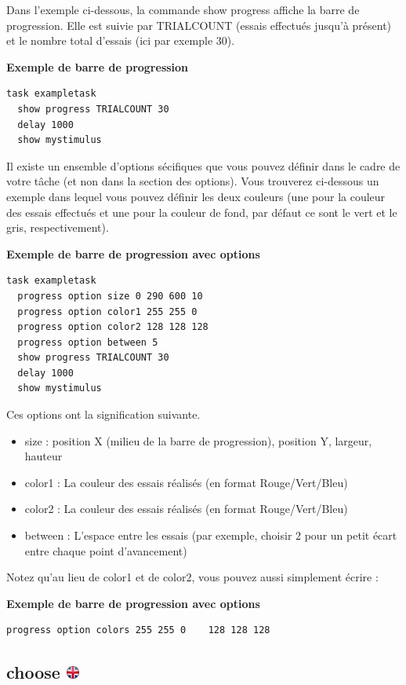 \documentclass[
]{book}
\providecommand{\tightlist}{%
  \setlength{\itemsep}{0pt}\setlength{\parskip}{0pt}}
\begin{document}
Dans l'exemple ci-dessous, la commande show progress affiche la barre de progression. Elle est suivie par TRIALCOUNT (essais effectués jusqu'à présent) et le nombre total d'essais (ici par exemple 30).

\textbf{Exemple de barre de progression}

\begin{verbatim}
task exampletask
  show progress TRIALCOUNT 30
  delay 1000
  show mystimulus
\end{verbatim}

Il existe un ensemble d'options sécifiques que vous pouvez définir dans le cadre de votre tâche (et non dans la section des options). Vous trouverez ci-dessous un exemple dans lequel vous pouvez définir les deux couleurs (une pour la couleur des essais effectués et une pour la couleur de fond, par défaut ce sont le vert et le gris, respectivement).

\textbf{Exemple de barre de progression avec options}

\begin{verbatim}
task exampletask
  progress option size 0 290 600 10
  progress option color1 255 255 0
  progress option color2 128 128 128
  progress option between 5
  show progress TRIALCOUNT 30
  delay 1000
  show mystimulus
\end{verbatim}

Ces options ont la signification suivante.

\begin{itemize}
\tightlist
\item
  size : position X (milieu de la barre de progression), position Y, largeur, hauteur
\item
  color1 : La couleur des essais réalisés (en format Rouge/Vert/Bleu)
\item
  color2 : La couleur des essais réalisés (en format Rouge/Vert/Bleu)
\item
  between : L'espace entre les essais (par exemple, choisir 2 pour un petit écart entre chaque point d'avancement)
\end{itemize}

Notez qu'au lieu de color1 et de color2, vous pouvez aussi simplement écrire :

\textbf{Exemple de barre de progression avec options}

\begin{verbatim}
progress option colors 255 255 0    128 128 128
\end{verbatim}

\hypertarget{choose}{%
\subsection[choose ]{\texorpdfstring{choose \href{https://www.psytoolkit.org/doc3.4.0/syntax.html\#task-choose}{\protect\includegraphics{img/ukflag.png}}}{choose }}\label{choose}}
\end{document}
